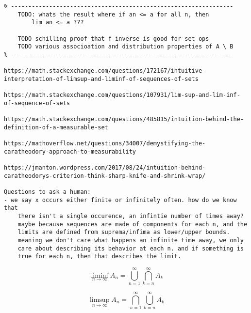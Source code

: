 \documentclass{article}
\begin{document}
\begin{flushleft}
\begin{verbatim}
% ----------------------------------------------------------------
    TODO: whats the result where if an <= a for all n, then 
        lim an <= a ???

    TODO schilling proof that f inverse is good for set ops
    TODO various associoation and distribution properties of A \ B
% ----------------------------------------------------------------

https://math.stackexchange.com/questions/172167/intuitive-interpretation-of-limsup-and-liminf-of-sequences-of-sets

https://math.stackexchange.com/questions/107931/lim-sup-and-lim-inf-of-sequence-of-sets

https://math.stackexchange.com/questions/485815/intuition-behind-the-definition-of-a-measurable-set

https://mathoverflow.net/questions/34007/demystifying-the-caratheodory-approach-to-measurability

https://jmanton.wordpress.com/2017/08/24/intuition-behind-caratheodorys-criterion-think-sharp-knife-and-shrink-wrap/

Questions to ask a human:
- we say x occurs either finite or infinitely often. how do we know that 
    there isn't a single occurence, an infintie number of times away?
    maybe because sequences are made of components for each n, and the 
    limits are defined from suprema/infima as lower/upper bounds. 
    meaning we don't care what happens an infinite time away, we only 
    care about describing its behavior at each n. and if something is 
    true for each n, then that describes the limit. 

\end{verbatim}

\[
    \liminf_{n \rightarrow \infty} A_n = \bigcup_{n=1}^{\infty} \bigcap_{k=n}^{\infty} A_k 
\]

\[
    \limsup_{n \rightarrow \infty} A_n = \bigcap_{n=1}^{\infty} \bigcup_{k=n}^{\infty} A_k
\]

\end{flushleft}
\end{document}
